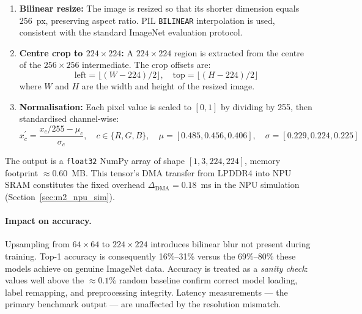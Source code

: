 \begin{enumerate}[itemsep=1pt, topsep=3pt]
    \item \textbf{Bilinear resize:} The image is resized so that its shorter
          dimension equals 256~px, preserving aspect ratio. PIL
          \texttt{BILINEAR} interpolation is used, consistent with the
          standard ImageNet evaluation protocol.

    \item \textbf{Centre crop to $224\times224$:} A $224\times224$ region is
          extracted from the centre of the $256\times256$ intermediate. The
          crop offsets are:
          \begin{equation}
              \text{left} = \lfloor(W-224)/2\rfloor,\quad
              \text{top}  = \lfloor(H-224)/2\rfloor
          \end{equation}
          where $W$ and $H$ are the width and height of the resized image.

    \item \textbf{Normalisation:} Each pixel value is scaled to $[0,1]$ by
          dividing by 255, then standardised channel-wise:
          \begin{equation}
              x_c^{\prime} = \frac{x_c/255 - \mu_c}{\sigma_c},\quad
              c\in\{R,G,B\},\quad
              \mu=[0.485,0.456,0.406],\quad
              \sigma=[0.229,0.224,0.225]
          \end{equation}
\end{enumerate}

The output is a \texttt{float32} NumPy array of shape $[1,3,224,224]$,
memory footprint $\approx0.60$~MB. This tensor's DMA transfer from LPDDR4
into NPU SRAM constitutes the fixed overhead $\Delta_{\text{DMA}}=0.18$~ms
in the NPU simulation (Section~\ref{sec:m2_npu_sim}).

\paragraph{Impact on accuracy.}
Upsampling from $64\times64$ to $224\times224$ introduces bilinear blur not
present during training. Top-1 accuracy is consequently 16\%--31\% versus the
69\%--80\% these models achieve on genuine ImageNet data. Accuracy is treated
as a \emph{sanity check}: values well above the $\approx0.1\%$ random
baseline confirm correct model loading, label remapping, and preprocessing
integrity. Latency measurements — the primary benchmark output — are
unaffected by the resolution mismatch.

